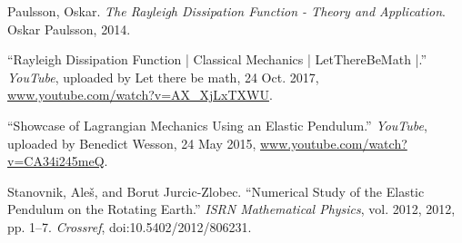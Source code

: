 \begin{thebibliography}{99}
Paulsson, Oskar. \emph{The Rayleigh Dissipation Function - Theory and Application}. Oskar Paulsson, 2014.


“Rayleigh Dissipation Function | Classical Mechanics | LetThereBeMath |.” \emph{YouTube}, uploaded by Let there be math, 24 Oct. 2017, \url{www.youtube.com/watch?v=AX\_XjLxTXWU}.


“Showcase of Lagrangian Mechanics Using an Elastic Pendulum.” \emph{YouTube}, uploaded by Benedict Wesson, 24 May 2015, \url{www.youtube.com/watch?v=CA34i245meQ}.



Stanovnik, Aleš, and Borut Jurcic-Zlobec. “Numerical Study of the Elastic Pendulum on the Rotating Earth.” \emph{ISRN Mathematical Physics}, vol. 2012, 2012, pp. 1–7. \emph{Crossref}, doi:10.5402/2012/806231.






\end{thebibliography}
